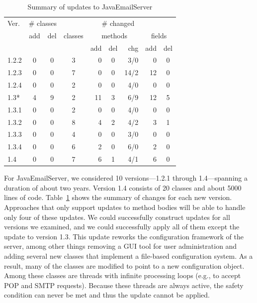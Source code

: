\documentclass[9pt]{sigplanconf}
\newcommand\T{\rule{0pt}{2.0ex}}
\begin{document}
\begin{table}[t]
\begin{footnotesize}
\begin{center}
\begin{tabular}{|l||c|c||c|r|c|r|r|c|} \hline \T
Ver.   & \multicolumn{2}{c||}{\# classes} &    \multicolumn{6}{c|}{\# changed} \\
       & add & del & classes & \multicolumn{3}{c|}{methods} & \multicolumn{2}{c|}{fields} \\
       &     &     &         & add & del & chg   & add & del \\ \hline \hline \T
1.2.2  & 0   & 0   & 3       & 0   & 0   & 3/0   & 0   & 0   \\
1.2.3  & 0   & 0   & 7       & 0   & 0   & 14/2  & 12  & 0   \\
1.2.4  & 0   & 0   & 2       & 0   & 0   & 4/0   & 0   & 0   \\
1.3*   & 4   & 9   & 2       & 11  & 3   & 6/9   & 12  & 5   \\
1.3.1  & 0   & 0   & 2       & 0   & 0   & 4/0   & 0   & 0   \\
1.3.2  & 0   & 0   & 8       & 4   & 2   & 4/2   & 3   & 1   \\
1.3.3  & 0   & 0   & 4       & 0   & 0   & 3/0   & 0   & 0   \\
1.3.4  & 0   & 0   & 6       & 2   & 0   & 6/0   & 2   & 0   \\
1.4    & 0   & 0   & 7       & 6   & 1   & 4/1   & 6   & 0   \\ \hline
\end{tabular}
\end{center}
\end{footnotesize}
\caption{Summary of updates to JavaEmailServer}
\label{tab:jes-changes}
\end{table}

For JavaEmailServer, we considered 10 versions---1.2.1 through
1.4---spanning a duration of about two years.   Version 1.4 
consists of 20 classes and about 5000 lines of code. 
Table~\ref{tab:jes-changes} shows the summary of changes for each new
version. Approaches that only support updates to method bodies will be able
to handle only four of these updates. We
could successfully construct updates for all versions we examined, and
we could successfully apply all of them except the update to version 1.3.
This update reworks the configuration framework of the server, among other
things removing a GUI tool for user administration and adding several
new classes that implement a file-based configuration system.  As a result, many of
the classes are modified to point to a new configuration object.
Among these classes are threads with infinite processing loops (e.g., to accept
POP and SMTP requests). Because these threads are always active, the
safety condition can never be met and thus the update cannot be
applied.
\end{document}
